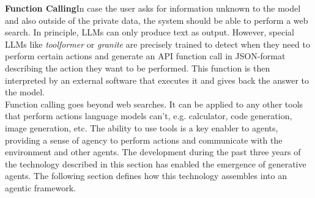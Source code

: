 \textbf{Function Calling}\indent In case the user asks for information unknown to the model and also outside of the private data, the system should be able to perform a web search. In principle, LLMs can only produce text as output. However, special LLMs like \textit{toolformer} \parencite{schick_toolformer_2023} or \textit{granite} \parencite{abdelaziz_granite-function_2024} are precisely trained to detect when they need to perform certain actions and generate an API function call in JSON-format describing the action they want to be performed. This function is then interpreted by an external software that executes it and gives back the answer to the model. \\
Function calling goes beyond web searches. It can be applied to any other tools that perform actions language models can't, e.g. calculator, code generation, image generation, etc. The ability to use tools is a key enabler to agents, providing a sense of agency to perform actions and communicate with the environment and other agents. The development during the past three years of the technology described in this section has enabled the emergence of generative agents. The following section defines how this technology assembles into an agentic framework.
